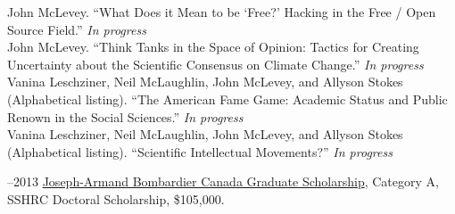 \documentclass[11pt,usenames,dvipsnames]{article}
\begin{document}



\ind John McLevey. ``What Does it Mean to be `Free?' Hacking in the Free / Open Source Field.'' \emph{In progress} \\ %

\ind John McLevey. ``Think Tanks in the Space of Opinion: Tactics for Creating Uncertainty about the Scientific Consensus on Climate Change.'' \emph{In progress} \\ %

\ind Vanina Leschziner, Neil McLaughlin, John McLevey, and Allyson Stokes (Alphabetical listing). ``The American Fame Game: Academic Status and Public Renown in the Social Sciences.'' \emph{In progress} \\ %

\ind Vanina Leschziner, Neil McLaughlin, John McLevey, and Allyson Stokes (Alphabetical listing). ``Scientific Intellectual Movements?'' \emph{In progress} \\ %





–2013 \href{http://www.sshrc-crsh.gc.ca/funding-financement/programs-programmes/fellowships/doctoral-doctorat-eng.aspx}{Joseph-Armand Bombardier Canada Graduate Scholarship}, Category A, SSHRC Doctoral Scholarship, \$105,000.\\
\end{document}
